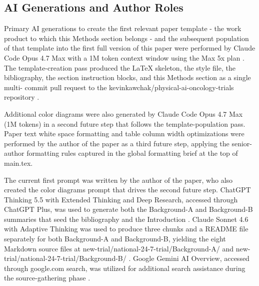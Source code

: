 
\subsection{AI Generations and Author Roles}
\label{sec:methods-ai}

Primary AI generations to create the first relevant paper template - the
work product to which this Methods section belongs - and the subsequent
population of that template into the first full version of this paper were
performed by Claude Code Opus 4.7 Max with a 1M token context window using
the Max 5x plan \cite{claude-opus-47, claude-code}. The template-creation
pass produced the LaTeX skeleton, the style file, the bibliography, the
section instruction blocks, and this Methods section as a single multi-
commit pull request to the kevinkawchak/physical-ai-oncology-trials
repository \cite{main-repo}.

Additional color diagrams were also generated by Claude Code Opus 4.7 Max
(1M tokens) in a second future step that follows the template-population
pass. Paper text white space formatting and table column width
optimizations were performed by the author of the paper as a third future
step, applying the senior-author formatting rules captured in the global
formatting brief at the top of main.tex.

The current first prompt was written by the author of the paper, who also
created the color diagrams prompt that drives the second future step.
ChatGPT Thinking 5.5 with Extended Thinking and Deep Research, accessed
through ChatGPT Plus, was used to generate both the Background-A and
Background-B summaries that seed the bibliography and the Introduction
\cite{chatgpt-thinking}. Claude Sonnet 4.6 with Adaptive Thinking was used
to produce three chunks and a README file separately for both Background-A
and Background-B, yielding the eight Markdown source files at
new-trial/national-24-7-trial/Background-A/ and new-trial/national-24-7-trial/Background-B/
\cite{claude-sonnet-46}. Google Gemini AI Overview, accessed through
google.com search, was utilized for additional search assistance during
the source-gathering phase \cite{google-gemini-overview}.

